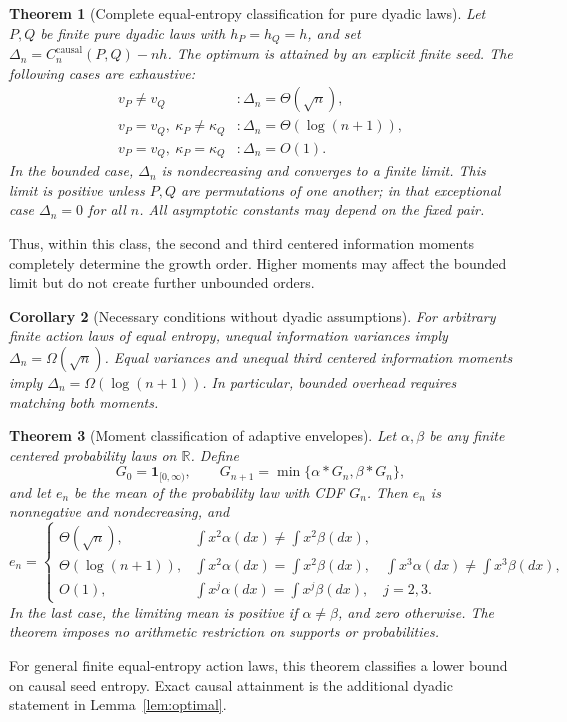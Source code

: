 \documentclass[11pt,a4paper]{article}
\newtheorem{theorem}{Theorem}
\newtheorem{corollary}[theorem]{Corollary}
\numberwithin{equation}{section}
\begin{document}
\begin{theorem}[Complete equal-entropy classification for pure dyadic laws]
\label{thm:classification}
Let $P,Q$ be finite pure dyadic laws with $h_P=h_Q=h$, and set
$\Delta_n=C_n^{\mathrm{causal}}(P,Q)-nh$.
The optimum is attained by an explicit finite seed. The following cases
are exhaustive:
\[
\boxed{
\begin{array}{ll}
v_P\ne v_Q &: \Delta_n=\Theta(\sqrt n),\\[2pt]
v_P=v_Q,\ \kappa_P\ne\kappa_Q &: \Delta_n=\Theta(\log(n+1)),\\[2pt]
v_P=v_Q,\ \kappa_P=\kappa_Q &: \Delta_n=O(1).
\end{array}}
\]
In the bounded case, $\Delta_n$ is nondecreasing and converges to a finite
limit. This limit is positive unless $P,Q$ are permutations of one another;
in that exceptional case $\Delta_n=0$ for all $n$.
All asymptotic constants may depend on the fixed pair.
\end{theorem}
Thus, within this class, the second and third centered information
moments completely determine the growth order. Higher moments may affect
the bounded limit but do not create further unbounded orders.

\begin{corollary}[Necessary conditions without dyadic assumptions]
\label{cor:general}
For arbitrary finite action laws of equal entropy, unequal information
variances imply $\Delta_n=\Omega(\sqrt n)$. Equal variances and unequal
third centered information moments imply $\Delta_n=\Omega(\log(n+1))$.
In particular, bounded overhead requires matching both moments.
\end{corollary}

\begin{theorem}[Moment classification of adaptive envelopes]\label{thm:analytic}
Let $\alpha,\beta$ be any finite centered probability laws on $\mathbb R$.
Define
\[
G_0=\mathbf1_{[0,\infty)},\qquad
G_{n+1}=\min\{\alpha*G_n,\beta*G_n\},
\]
and let $e_n$ be the mean of the probability law with CDF $G_n$.
Then $e_n$ is nonnegative and nondecreasing, and
\[
e_n=\begin{cases}
\Theta(\sqrt n),& \int x^2\alpha(dx)\ne\int x^2\beta(dx),\\
\Theta(\log(n+1)),& \int x^2\alpha(dx)=\int x^2\beta(dx),\quad
                    \int x^3\alpha(dx)\ne\int x^3\beta(dx),\\
O(1),& \int x^j\alpha(dx)=\int x^j\beta(dx),\quad j=2,3.
\end{cases}
\]
In the last case, the limiting mean is positive if $\alpha\ne\beta$,
and zero otherwise. The theorem imposes no arithmetic restriction on
supports or probabilities.
\end{theorem}
For general finite equal-entropy action laws, this theorem classifies a
lower bound on causal seed entropy. Exact causal attainment is the
additional dyadic statement in Lemma~\ref{lem:optimal}.
\end{document}

